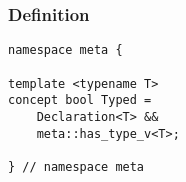 
\subsubsection{Definition}

\begin{verbatim}
namespace meta {

template <typename T>
concept bool Typed =
	Declaration<T> &&
	meta::has_type_v<T>;

} // namespace meta
\end{verbatim}
